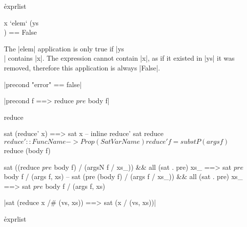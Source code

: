 \h{exprlist}\begin{code}
x `elem` (ys \\ [x]) == False
\end{code}

The |elem| application is only true if |ys \\ [x]| contains |x|. The expression cannot contain |x|, as if it existed in |ys| it was removed, therefore this application is always |False|.


{|precond "error" == false|}


{|precond f ==> reduce $ pre $ body f|}



\ignore\begin{code}
reduce

sat (reduce' x) ==> sat x
    -- inline reduce'
sat reduce $
reduce' :: FuncName -> Prop (Sat VarName)
reduce' f = substP (args f) $ reduce (body f)




sat ((reduce $ pre $ body f) / (argsN f / xs_)) && all (sat . pre) xs_ ==> sat $ pre $ body f / (args f, xs)
    -- 
sat (pre (body f) / (args f / xs_)) && all (sat . pre) xs_ ==> sat $ pre $ body f / (args f, xs)
\end{code}






{|sat (reduce x /# (vs, xs)) ==> sat (x / (vs, xs))|}

\h{exprlist}

\ignore{}

